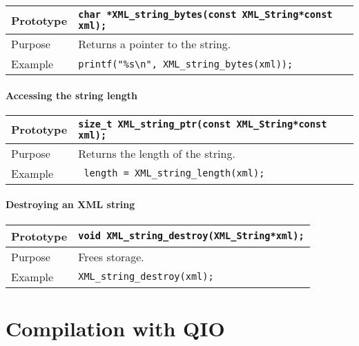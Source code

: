 \documentclass{article}
\newcommand{\QMDhandle}{{\tt XML\_String}}
\begin{document}
\begin{flushleft}
  \begin{tabular}{|l|l|}
  \hline
  Prototype      & \verb|char *XML_string_bytes(const |\QMDhandle \verb|*const xml);|\\
    \hline
  Purpose        & Returns a pointer to the string. \\
   \hline
  Example        & \verb|printf("%s\n", XML_string_bytes(xml));| \\
   \hline
 \end{tabular}
\end{flushleft}
%
\paragraph{Accessing the string length}

\begin{flushleft}
  \begin{tabular}{|l|l|}
  \hline
  Prototype      & \verb|size_t XML_string_ptr(const |\QMDhandle \verb|*const xml);|\\
    \hline
  Purpose        & Returns the length of the string. \\
   \hline
  Example        & \verb| length = XML_string_length(xml);| \\
   \hline
 \end{tabular}
\end{flushleft}
%
\paragraph{Destroying an XML string}

\begin{flushleft}
  \begin{tabular}{|l|l|}
  \hline
  Prototype      & \verb|void XML_string_destroy(|\QMDhandle \verb|*xml);|\\
    \hline
  Purpose        & Frees storage. \\
   \hline
  Example        & \verb|XML_string_destroy(xml);| \\
   \hline
 \end{tabular}
\end{flushleft}
%


\section{Compilation with QIO}
\end{document}
